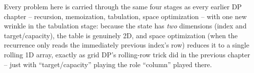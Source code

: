 Every problem here is carried through the same four stages as every
earlier DP chapter -- recursion, memoization, tabulation, space
optimization -- with one new wrinkle in the tabulation stage: because the
state has \emph{two} dimensions (index and target/capacity), the table
is genuinely 2D, and space optimization (when the recurrence only reads
the immediately previous index's row) reduces it to a single rolling 1D
array, exactly as grid DP's rolling-row trick did in the previous
chapter -- just with ``target/capacity'' playing the role ``column''
played there.

\newpage











